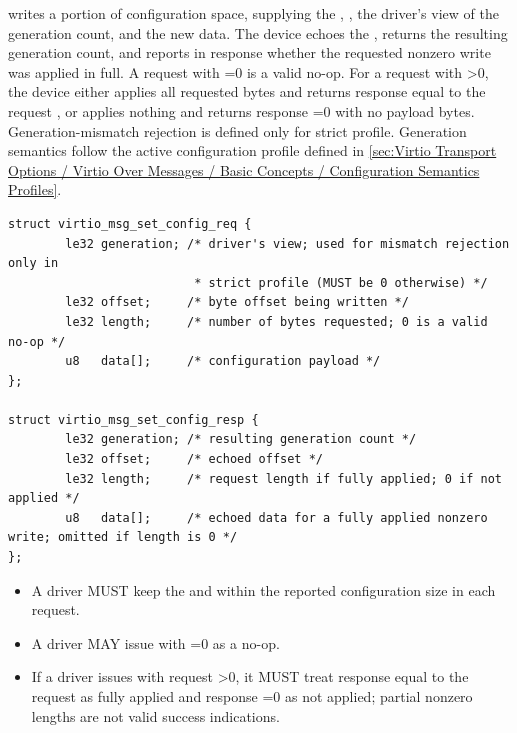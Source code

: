 
 writes a portion of configuration space, supplying the
, , the driver's view of the generation count, and
the new data. The device echoes the , returns the
resulting generation count, and reports in response  whether the
requested nonzero write was applied in full. A request with =0 is
a valid no-op. For a request with >0, the device either applies
all requested bytes and returns response  equal to the request
, or applies nothing and returns response =0 with no
payload bytes.
Generation-mismatch rejection is defined only for strict profile.
Generation semantics follow the active configuration profile defined in
\ref{sec:Virtio Transport Options / Virtio Over Messages / Basic Concepts / Configuration Semantics Profiles}.

\begin{lstlisting}
struct virtio_msg_set_config_req {
        le32 generation; /* driver's view; used for mismatch rejection only in
                          * strict profile (MUST be 0 otherwise) */
        le32 offset;     /* byte offset being written */
        le32 length;     /* number of bytes requested; 0 is a valid no-op */
        u8   data[];     /* configuration payload */
};

struct virtio_msg_set_config_resp {
        le32 generation; /* resulting generation count */
        le32 offset;     /* echoed offset */
        le32 length;     /* request length if fully applied; 0 if not applied */
        u8   data[];     /* echoed data for a fully applied nonzero write; omitted if length is 0 */
};
\end{lstlisting}

\begin{itemize}
  \item A driver MUST keep the  and  within the
        reported configuration size in each  request.
  \item A driver MAY issue  with =0 as a
        no-op.
  \item If a driver issues  with request >0,
        it MUST treat response  equal to the request
         as fully applied and response =0 as not
        applied; partial nonzero lengths are not valid success indications.
\end{itemize}

